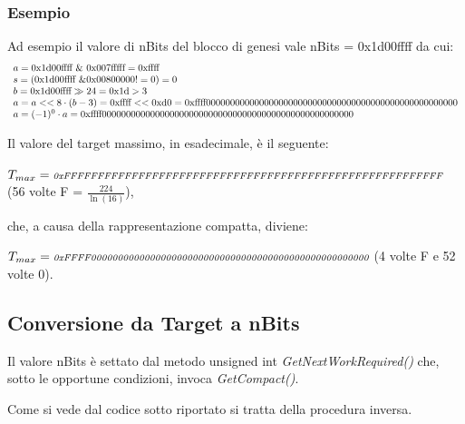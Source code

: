 \documentclass{article}
\begin{document}
\subsubsection{Esempio}
Ad esempio il valore di nBits del blocco di genesi vale nBits = 0x1d00ffff da cui:
\begin{equation}
    \begin{array}{ll}
        a = \textnormal{0x1d00ffff} \ \& \ \textnormal{0x007fffff} = \textnormal{0xffff} \\
        s = (\textnormal{0x1d00ffff} \ \& \textnormal{0x00800000} != 0) = 0 \\
        b = \textnormal{0x1d00ffff} \gg 24 = \textnormal{0x1d} > 3\\
        a = a << 8 \cdot (b - 3) = \textnormal{0xffff} << \textnormal{0xd0} = \textnormal{0xffff0000000000000000000000000000000000000000000000000000} \\
        a = (-1)^0 \cdot a =  \textnormal{0xffff0000000000000000000000000000000000000000000000000000}
    \end{array}
\end{equation}

Il valore del target massimo, in esadecimale, è il seguente:

$T_{max} = \textit{\scriptsize{0xFFFFFFFFFFFFFFFFFFFFFFFFFFFFFFFFFFFFFFFFFFFFFFFFFFFFFFFF}}$  (56 volte F = $\frac{224}{\ln(16)}$),

che, a causa della rappresentazione compatta, diviene:

$T_{max} = \textit{\scriptsize{0xFFFF0000000000000000000000000000000000000000000000000000}}$ (4 volte F e 52 volte 0).

\subsection{Conversione da Target a nBits}

Il valore nBits è settato dal metodo unsigned int \textit{GetNextWorkRequired()} che,
sotto le opportune condizioni, invoca \textit{GetCompact()}.

Come si vede dal codice sotto riportato si tratta della procedura inversa.
\end{document}

